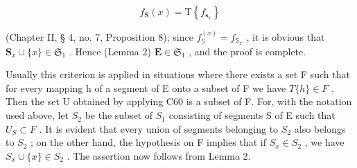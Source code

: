 \[
f _ {\mathbf {S}} (x) = \mathrm{T} \left\{f _ {\mathbf {s} _ {x}} \right\}
\]

(Chapter II, § 4, no. 7, Proposition 8); since \(f_{\mathbb{S}}^{(x)} = f_{\mathbb{S}_x}\) , it is obvious that \(\mathbf{S}_x \cup \{x\} \in \mathfrak{S}_1\) . Hence (Lemma 2) \(\mathbf{E} \in \mathfrak{S}_1\) , and the proof is complete.

Usually this criterion is applied in situations where there exists a set F such that for every mapping h of a segment of E onto a subset of F we have \(T\{h\}\in F\) . Then the set U obtained by applying C60 is a subset of F. For, with the notation used above, let \(S_{2}\) be the subset of \(S_{1}\) consisting of segments S of E such that \(U_{S}\subset F\) . It is evident that every union of segments belonging to \(S_{2}\) also belongs to \(S_{2}\) ; on the other hand, the hypothesis on F implies that if \(S_{x}\in S_{2}\) , we have \(S_{x}\cup\{x\}\in S_{2}\) . The assertion now follows from Lemma 2.

